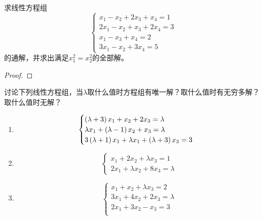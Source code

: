 \begin{problem}\label{problem-2.3}
求线性方程组
\begin{equation*}
    \begin{cases}
        x_1-x_2+2x_3+x_4=1  \\
        2x_1-x_2+x_3+2x_4=3 \\
        x_1-x_3+x_4=2       \\
        3x_1-x_2+3x_4=5
    \end{cases}
\end{equation*}
的通解，并求出满足\(x_1^2=x_2^2\)的全部解。
\end{problem}
\begin{proof}
\end{proof}

\begin{problem}\label{problem-2.4}
讨论下列线性方程组，当\(\lambda\)取什么值时方程组有唯一解？取什么值时有无穷多解？取什么值时无解？
\begin{enumerate}
    \item \begin{equation*}
              \begin{cases}
                  \left( \lambda+3 \right)x_1+x_2+2x_3=\lambda        \\
                  \lambda x_1+\left( \lambda-1 \right)x_2+x_3=\lambda \\
                  3\left( \lambda+1 \right)x_1+\lambda x_1+\left( \lambda+3 \right)x_3=3
              \end{cases}
          \end{equation*}
    \item
          {
          \begin{equation*}
              \begin{cases}
                  x_1+2x_2+\lambda x_3=1 \\
                  2x_1+\lambda x_2+8x_3=\lambda
              \end{cases}
          \end{equation*}
          }
    \item \begin{equation*}
              \begin{cases}
                  x_1+x_2+\lambda x_3=2  \\
                  3x_1+4x_2+2x_3=\lambda \\
                  2x_1+3x_2-x_3=3        \\
              \end{cases}
          \end{equation*}
\end{enumerate}
\end{problem}
